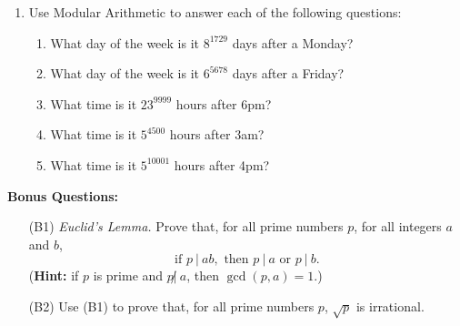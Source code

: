\documentclass{article}
\begin{document}
\begin{enumerate}
    	\item Use Modular Arithmetic to answer each of the following questions:
    		\begin{enumerate}
    			\item What day of the week is it $8^{1729}$ days after a Monday?
    			\item What day of the week is it $6^{5678}$ days after a Friday?
    			\item What time is it $23^{9999}$ hours after 6pm?
    			\item What time is it $5^{4500}$ hours after 3am?
    			\item What time is it $5^{10001}$ hours after 4pm?
    		\end{enumerate}
    \end{enumerate}
    
    \newpage
    \textbf{Bonus Questions:}
    
    \begin{itemize}

    	\item [(B1)] \emph{Euclid's Lemma.} Prove that, for all prime numbers $p$, for all integers $a$ and $b$,
    		\[
    			\text{if } p\ |\ ab, \text{ then } p\ |\ a \text{ or } p\ |\ b.
    		\]
    		(\textbf{Hint:} if $p$ is prime and $p\not|\ a$, then $\gcd(p,a) = 1$.)

    	\item [(B2)] Use (B1) to prove that, for all prime numbers $p$, $\sqrt{p}$ is irrational.
    \end{itemize}
    
\end{document}
